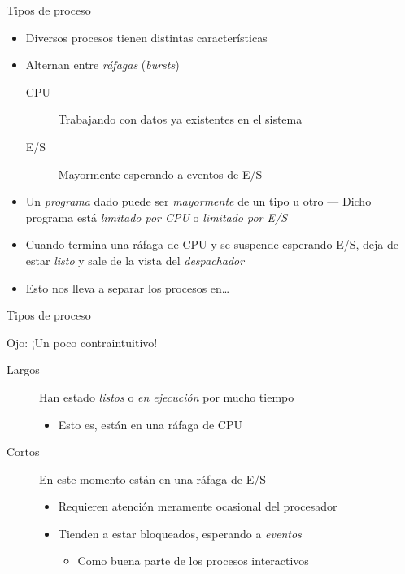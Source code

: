 \documentclass[presentation]{beamer}
\begin{document}
\begin{frame}[label={sec:org8d5d7f1}]{Tipos de proceso}
\begin{itemize}
\item Diversos procesos tienen distintas características
\item Alternan entre \emph{ráfagas} (\emph{bursts})
\begin{description}
\item[{CPU}] Trabajando con datos ya existentes en el sistema
\item[{E/S}] Mayormente esperando a eventos de E/S
\end{description}
\item Un \emph{programa} dado puede ser \emph{mayormente} de un tipo u otro — Dicho
programa está \emph{limitado por CPU} o \emph{limitado por E/S}
\item Cuando termina una ráfaga de CPU y se suspende esperando E/S, deja
de estar \emph{listo} y sale de la vista del \emph{despachador}
\item Esto nos lleva a separar los procesos en\ldots{}
\end{itemize}
\end{frame}

\begin{frame}[label={sec:org16287cd}]{Tipos de proceso}
\begin{center}
\alert{Ojo: ¡Un poco contraintuitivo!}
\end{center}
\begin{description}
\item[{Largos}] Han estado \emph{listos} o \emph{en ejecución} por mucho tiempo
\begin{itemize}
\item Esto es, están en una ráfaga de CPU
\end{itemize}
\item[{Cortos}] En este momento están en una ráfaga de E/S
\begin{itemize}
\item Requieren atención meramente ocasional del procesador
\item Tienden a estar bloqueados, esperando a \emph{eventos}
\begin{itemize}
\item Como buena parte de los procesos interactivos
\end{itemize}
\end{itemize}
\end{description}
\end{frame}
\end{document}
